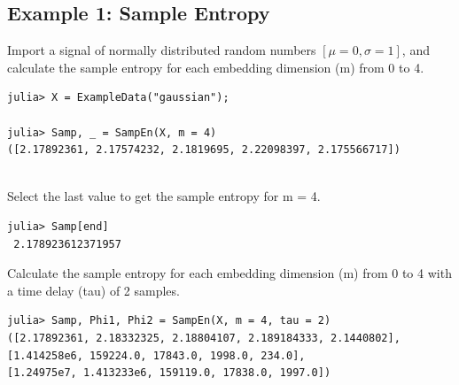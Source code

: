 \documentclass[12pt, a4paper, titlepage, openany]{book}
\begin{document}
\subsection{\normalsize Example 1: \hspace{15mm} Sample Entropy}
\noindent Import a signal of normally distributed random numbers $[\mu = 0, \sigma = 1]$, and calculate the sample entropy for each embedding dimension (m) from 0 to 4.
\begin{verbatim}
julia> X = ExampleData("gaussian");

julia> Samp, _ = SampEn(X, m = 4)
([2.17892361, 2.17574232, 2.1819695, 2.22098397, 2.175566717])
 
\end{verbatim}
Select the last value to get the sample entropy for m = 4.
\begin{verbatim}
julia> Samp[end]
 2.178923612371957
\end{verbatim}
Calculate the sample entropy for each embedding dimension (m) from 0 to 4 with a time delay (tau) of 2 samples.
\begin{verbatim}
julia> Samp, Phi1, Phi2 = SampEn(X, m = 4, tau = 2)
([2.17892361, 2.18332325, 2.18804107, 2.189184333, 2.1440802], 
[1.414258e6, 159224.0, 17843.0, 1998.0, 234.0], 
[1.24975e7, 1.413233e6, 159119.0, 17838.0, 1997.0])
\end{verbatim}



\newpage
\end{document}
